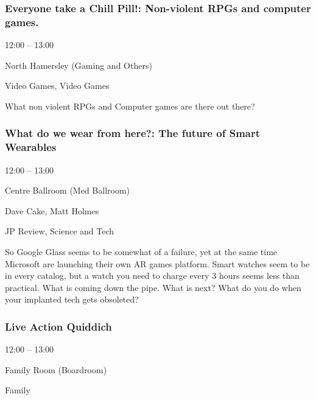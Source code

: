 \documentclass{scrreprt}
\begin{document}
\begin{multicols}{2}
\subsubsection*{Everyone take a Chill Pill!: Non-violent RPGs and computer games.}\begin{description}
\setlength{\itemsep}{0pt}
\setlength{\parsep}{0pt}
\setlength{\parskip}{0pt}
\item[Time:]{12:00 -- 13:00}
\item[Venue:]{North Hamersley (Gaming and Others)}
\item[Tags:]{Video Games, Video Games}\end{description}
What non violent RPGs and Computer games are there out there?
\subsubsection*{What do we wear from here?: The future of Smart Wearables}\begin{description}
\setlength{\itemsep}{0pt}
\setlength{\parsep}{0pt}
\setlength{\parskip}{0pt}
\item[Time:]{12:00 -- 13:00}
\item[Venue:]{Centre Ballroom (Med Ballroom)}
\item[People:]{Dave Cake, Matt Holmes}
\item[Tags:]{JP Review, Science and Tech}\end{description}
So Google Glass seems to be somewhat of a failure, yet at the same time Microsoft are launching their own AR games platform. Smart watches seem to be in every catalog, but a watch you need to charge every 3 hours seems less than practical. What is coming down the pipe. What is next? What do you do when your implanted tech gets obsoleted?
\subsubsection*{Live Action Quiddich}\begin{description}
\setlength{\itemsep}{0pt}
\setlength{\parsep}{0pt}
\setlength{\parskip}{0pt}
\item[Time:]{12:00 -- 13:00}
\item[Venue:]{Family Room (Boardroom)}
\item[Tags:]{Family}\end{description}


\end{multicols}
\end{document}
